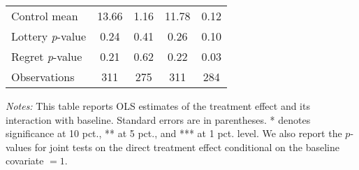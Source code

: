 \begin{table}[htbp]
{\begin{threeparttable}
\begin{tabular}{l*{4}{c}}
Control mean    &    13.66         &     1.16         &    11.78         &     0.12         \\
Lottery \emph{p}-value&     0.24         &     0.41         &     0.26         &     0.10         \\
Regret \emph{p}-value&     0.21         &     0.62         &     0.22         &     0.03         \\
Observations    &      311         &      275         &      311         &      284         \\
\bottomrule \end{tabular} \begin{tablenotes}[flushleft] \footnotesize \item \emph{Notes:} This table reports OLS estimates of the treatment effect and its interaction with baseline. Standard errors are in parentheses. * denotes significance at 10 pct., ** at 5 pct., and *** at 1 pct. level. We also report the \(p\)-values for joint tests on the direct treatment effect conditional on the baseline covariate $= 1$. \end{tablenotes} \end{threeparttable} } \end{table}
